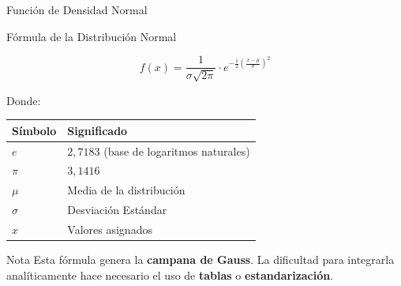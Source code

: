 \documentclass[10pt]{beamer}
\begin{document}
\begin{frame}{Función de Densidad Normal}
\begin{block}{Fórmula de la Distribución Normal}
\begin{center}
\Large
$$f(x) = \frac{1}{\sigma\sqrt{2\pi}} \cdot e^{-\frac{1}{2}\left(\frac{x-\mu}{\sigma}\right)^2}$$
\end{center}
\end{block}

\vspace{0.3cm}
\begin{exampleblock}{Donde:}
\begin{center}
\begin{tabular}{ll}
\toprule
\textbf{Símbolo} & \textbf{Significado} \\
\midrule
$e$ & $2,7183$ (base de logaritmos naturales) \\
$\pi$ & $3,1416$ \\
$\mu$ & Media de la distribución \\
$\sigma$ & Desviación Estándar \\
$x$ & Valores asignados \\
\bottomrule
\end{tabular}
\end{center}
\end{exampleblock}

\vspace{0.2cm}
\begin{alertblock}{Nota}
Esta fórmula genera la \textbf{campana de Gauss}. La dificultad para integrarla analíticamente hace necesario el uso de \textbf{tablas} o \textbf{estandarización}.
\end{alertblock}
\end{frame}
\end{document}
